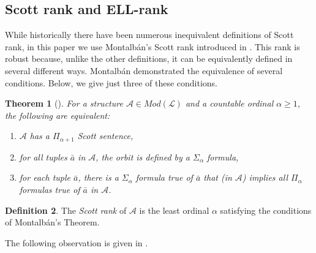 \documentclass{article}
\newcommand{\ELL}{\textnormal{ELL}}
\newtheorem{thm}{Theorem}[section]
\theoremstyle{definition}
\newtheorem{defn}[thm]{Definition}
\begin{document}
	\subsection{Scott rank and \ELL-rank}
	
	While historically there have been numerous inequivalent definitions of Scott rank, in this paper we use Montalb\'{a}n's Scott rank introduced in \cite{robuster}. This rank is robust because, unlike the other definitions, it can be equivalently defined in several different ways. Montalb\'{a}n demonstrated the equivalence of several conditions. Below, we give just three of these conditions. 
	
	\begin{thm} [\cite{robuster}]
		
		For a structure $\mathcal{A}\in Mod(\mathcal{L})$ and a countable ordinal $\alpha\geq 1$, the following are equivalent: 
		
		\begin{enumerate}
			
			\item $\mathcal{A}$ has a $\Pi_{\alpha+1}$ Scott sentence,
			
			\item for all tuples $\bar{a}$ in $\mathcal{A}$, the orbit is defined by a $\Sigma_\alpha$ formula,
			
			\item for each tuple $\bar{a}$, there is a $\Sigma_\alpha$ formula true of $\bar{a}$ that (in $\mathcal{A}$) implies all $\Pi_\alpha$ formulas true of $\bar{a}$ in $\mathcal{A}$. 
			
		\end{enumerate}
		
	\end{thm}
	
	\begin{defn}
		
		The \emph{Scott rank} of $\mathcal{A}$ is the least ordinal $\alpha$ satisfying the conditions of Montalb\'{a}n's Theorem.
		
	\end{defn}
	
	The following observation is given in \cite{GonzalezKnight}.
	
\end{document}
